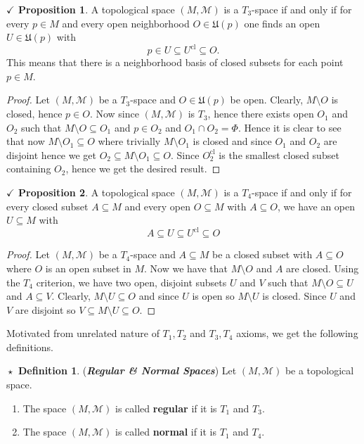 \documentclass{article}
\newcommand{\notset}[0]{\setminus}
\theoremstyle{definition}
\newtheorem{definition}{$\boxed{\star}$ Definition}
\theoremstyle{remark}
\theoremstyle{definition}
\theoremstyle{definition}
\newtheorem{proposition}{$\checkmark$ Proposition}
\newcommand{\topo}[1]{\mathcal{#1}}
\newcommand{\nbdsys}[2]{\mathfrak{#1}(#2)}
\newcommand{\closure}[1]{#1^{\text{cl}}}
\newcommand{\intrs}[0]{\cap}
\begin{document}
\hrulefill
\begin{proposition}
	A topological space $ (M,\topo{M}) $ is a $ T_3 $-space if and only if for every $ p\in M $ and every open neighborhood $ O\in \nbdsys{U}{p} $ one finds an open $ U \in \nbdsys{U}{p} $  with
	\[ p \in U \subseteq \closure{U} \subseteq O.\]
	This means that there is a neighborhood basis of closed subsets for each point $ p\in M $.
\end{proposition}
\begin{proof}
	Let $ (M,\topo{M}) $ be a $ T_3 $-space and $ O \in \nbdsys{U}{p} $ be open. Clearly, $ M \notset O $ is closed, hence $ p\in O $. Now since $ (M,\topo{M}) $ is $ T_3 $, hence there exists open $ O_1 $ and $ O_2 $ such that $ M\notset O \subseteq O_1$ and $ p\in O_2 $ and $ O_1 \intrs O_2 = \Phi $. Hence it is clear to see that now $ M\notset O_1 \subseteq O $ where trivially $ M\notset O_1 $ is closed and since $ O_1 $ and $ O_2 $ are disjoint hence we get $ O_2 \subseteq M\notset O_1 \subseteq O $. Since $ \closure{O_2} $ is the smallest closed subset containing $ O_2 $, hence we get the desired result.
\end{proof}
\hrulefill
\begin{proposition}
	A topological space $ (M,\topo{M}) $ is a $ T_4 $-space if and only if for every closed subset $ A \subseteq M $ and every open $ O \subseteq M $ with $ A\subseteq O $, we have an open $ U \subseteq M $ with 
	\[A \subseteq U \subseteq \closure{U} \subseteq O\]
\end{proposition}
\begin{proof}
	Let $ (M,\topo{M}) $ be a $ T_4 $-space and $ A \subseteq M $ be a closed subset with $ A \subseteq O $ where $ O $ is an open subset in $ M $. Now we have that $ M\notset O $ and $ A $ are closed. Using the $ T_4 $ criterion, we have two open, disjoint subsets $ U $ and $ V $ such that $ M\notset O \subseteq U $ and $ A \subseteq V $. Clearly, $ M\notset U \subseteq O $ and since $ U $ is open so $ M\notset U $ is closed. Since $ U $ and $ V $ are disjoint so $ V \subseteq M\notset U \subseteq O $. 
\end{proof}
\hrulefill
Motivated from unrelated nature of $ T_1, T_2 $ and $ T_3, T_4 $ axioms, we get the following definitions.
\hrulefill
\begin{definition}
	(\textit{\textbf{Regular \& Normal Spaces}}) Let $ (M,\topo{M}) $ be a topological space.
	\begin{enumerate}
		\item{The space $ (M,\topo{M}) $ is called \textbf{regular} if it is $ T_1 $ and $ T_3 $.}
		\item{The space $ (M,\topo{M}) $ is called \textbf{normal} if it is $ T_1 $ and $ T_4 $.}
	\end{enumerate}
\end{definition}
\end{document}
